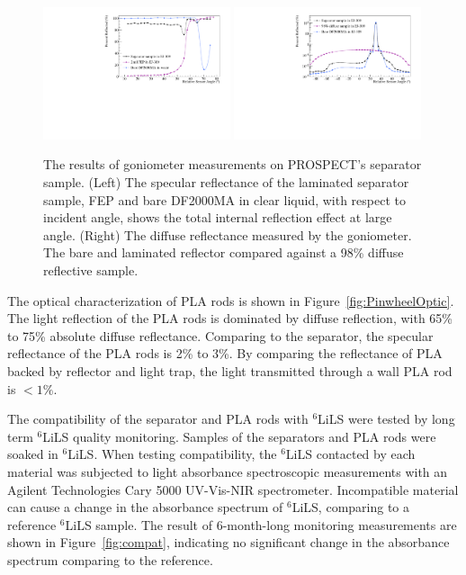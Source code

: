 \begin{figure}[h!]
\centering
\includegraphics[width=0.49\textwidth]{Figures/DF2000specCompare.pdf}
\includegraphics[width=0.49\textwidth]{Figures/DF2000diffCompare.pdf}
\caption[Results of the goniometer measurements]{The results of goniometer measurements on PROSPECT's separator sample. (Left) The specular reflectance of the laminated separator sample, FEP and bare DF2000MA in clear liquid, with respect to incident angle, shows the total internal reflection effect at large angle. (Right) The diffuse reflectance measured by the goniometer. The bare and laminated reflector compared against a 98\% diffuse reflective sample.}
\label{fig:gonioreflect}
\end{figure}

The optical characterization of PLA rods is shown in Figure~\ref{fig:PinwheelOptic}.
The light reflection of the PLA rods is dominated by diffuse reflection, with 65\% to 75\% absolute diffuse reflectance.
Comparing to the separator, the specular reflectance of the PLA rods is 2\% to 3\%.
By comparing the reflectance of PLA backed by reflector and light trap, the light transmitted through a wall PLA rod is $<1\%$.

The compatibility of the separator and PLA rods with $^6$LiLS were tested by long term $^6$LiLS quality monitoring.
Samples of the separators and PLA rods were soaked in $^6$LiLS.
When testing compatibility, the $^6$LiLS contacted by each material was subjected to light absorbance spectroscopic measurements with an Agilent Technologies Cary 5000 UV-Vis-NIR spectrometer. 
Incompatible material can cause a change in the absorbance spectrum of $^6$LiLS, comparing to a reference $^6$LiLS sample.
The result of 6-month-long monitoring measurements are shown in Figure~\ref{fig:compat}, indicating no significant change in the absorbance spectrum comparing to the reference.

